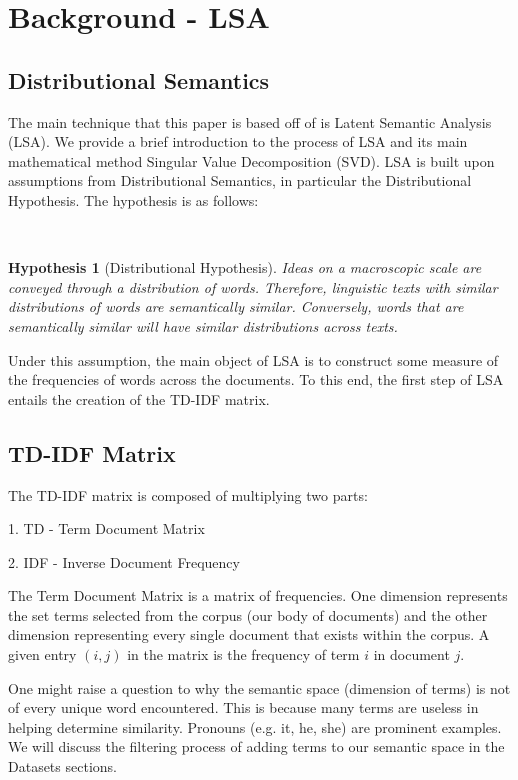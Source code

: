 \documentclass [12pt]{article}
\newtheorem*{hypothesis}{Hypothesis}
\begin{document}
\section{Background  -  LSA} 
\subsection{Distributional Semantics}
The main technique that this paper is based off of is Latent Semantic Analysis (LSA). We provide a brief introduction to the process of LSA and its main mathematical method Singular Value Decomposition (SVD). LSA is built upon assumptions from Distributional Semantics, in particular the Distributional Hypothesis. The hypothesis is as follows: 

\ 
\begin{hypothesis}[Distributional Hypothesis]
Ideas on a macroscopic scale are conveyed through a distribution of words. Therefore, linguistic texts with similar distributions of words are semantically similar. Conversely, words that are semantically similar will have similar distributions across texts. 
\end{hypothesis} 

Under this assumption, the main object of LSA is to construct some measure of the frequencies of words across the documents. To this end, the first step of LSA entails the creation of the TD-IDF matrix. 

\subsection{TD-IDF Matrix} 
The TD-IDF matrix is composed of multiplying two parts:

1. TD - Term Document Matrix 

2. IDF - Inverse Document Frequency

The Term Document Matrix is a matrix of frequencies. One dimension represents the set terms selected from the corpus (our body of documents) and the other dimension representing every single document that exists within the corpus. A given entry $(i, j)$ in the matrix is the frequency of term $i$ in document $j$. 

One might raise a question to why the semantic space (dimension of terms) is not of every unique word encountered. This is because many terms are useless in helping determine similarity. Pronouns (e.g. it, he,  she) are  prominent examples. We will discuss the filtering process of adding terms to our semantic space in the Datasets sections. 
\end{document}
